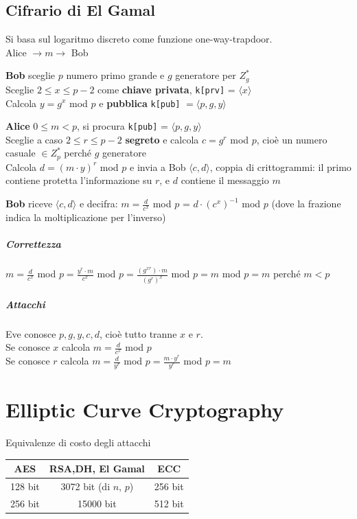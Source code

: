 \documentclass[10pt]{book}
\begin{document}
\section{Cifrario di El Gamal}
Si basa sul logaritmo discreto come funzione one-way-trapdoor.\\
Alice $\rightarrow m\rightarrow$ Bob
\begin{list}{}{}
	\item \textbf{Bob} sceglie $p$ numero primo grande e $g$ generatore per $Z_g^*$\\
	Sceglie $2\leq x \leq p-2$ come \textbf{chiave privata}, \texttt{k[prv]} = $\langle x\rangle$\\
	Calcola $y = g^x$ mod $p$ e \textbf{pubblica} \texttt{k[pub]} $=\langle p,g,y\rangle$
	\item \textbf{Alice} $0\leq m < p$, si procura \texttt{k[pub]} = $\langle p,g,y\rangle$\\
	Sceglie a caso $2 \leq r \leq p-2$ \textbf{segreto} e calcola $c = g^r$ mod $p$, cioè un numero casuale $\in Z_p^*$ perché $g$ generatore\\
	Calcola $d = \left(m\cdot y\right)^r$ mod $p$ e invia a Bob $\langle c,d\rangle$, coppia di crittogrammi: il primo contiene protetta l'informazione su $r$, e $d$ contiene il messaggio $m$
	\item \textbf{Bob} riceve $\langle c,d\rangle$ e decifra: $m = \frac{d}{c^x}$ mod $p$ = $d\cdot\left(c^x\right)^{-1}$ mod $p$ (dove la frazione indica la moltiplicazione per l'inverso)
\end{list}
\pagebreak
\paragraph{Correttezza} $m = \frac{d}{c^x}$ mod $p = \frac{y^r\cdot m}{c^x}$ mod $p = \frac{(g^{xr})\cdot m}{(g^r)^x}$ mod $p = m$ mod $p = m$ perché $m < p$
\paragraph{Attacchi} Eve conosce $p,g,y,c,d$, cioè tutto tranne $x$ e $r$.\\
Se conosce $x$ calcola $m = \frac{d}{c^x}$ mod $p$\\
Se conosce $r$ calcola $m = \frac{d}{y^r}$ mod $p = \frac{m\cdot y^r}{y^r}$ mod $p = m$
\chapter{Elliptic Curve Cryptography}
\begin{center}
Equivalenze di costo degli attacchi\\
\begin{tabular}{c | c | c}
AES & RSA,DH, El Gamal & ECC\\
\hline
128 bit & 3072 bit (di $n$, $p$) & 256 bit\\
256 bit & 15000 bit & 512 bit
\end{tabular}
\end{center}
\end{document}
